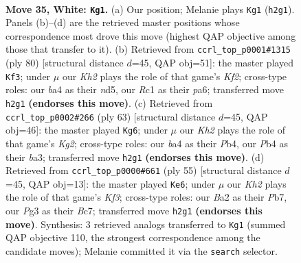 \documentclass[11pt]{article}
\begin{document}
\clearpage

\begin{figure}[p]\centering
\begin{subfigure}{0.46\textwidth}\centering
\resizebox{\linewidth}{!}{%
\newchessgame
\chessboard[
  setfen={r7/pp3p2/5k2/7p/bP2P3/P5Pp/B4r1K/R1R5 w - - 0 35},
  showmover=false,
  pgfstyle=straightmove, color=movearrow, markmove={h2-g1}
]}
\caption{}
\end{subfigure}\hfill
\begin{subfigure}{0.46\textwidth}\centering
\resizebox{\linewidth}{!}{%
\newchessgame
\chessboard[
  setfen={1r3k2/1p1R3R/p3p1p1/3n4/5P2/7P/PPr2KP1/8 w - - 17 41},
  showmover=false,
  pgfstyle=straightmove, color=movearrow, markmove={f2-f3}
]}
\caption{}
\end{subfigure}
\\[4pt]
\begin{subfigure}{0.46\textwidth}\centering
\resizebox{\linewidth}{!}{%
\newchessgame
\chessboard[
  setfen={r3r3/n2R2k1/5p2/p1P4p/1p6/BP2P1P1/1P5P/2R2K2 b - - 1 32},
  showmover=false,
  pgfstyle=straightmove, color=movearrow, markmove={g7-g6}
]}
\caption{}
\end{subfigure}\hfill
\begin{subfigure}{0.46\textwidth}\centering
\resizebox{\linewidth}{!}{%
\newchessgame
\chessboard[
  setfen={2r4r/1pbR3p/2p2k2/p4p2/5P2/2P5/P3P1BP/1R4K1 b - - 7 28},
  showmover=false,
  pgfstyle=straightmove, color=movearrow, markmove={f6-e6}
]}
\caption{}
\end{subfigure}
\caption{\textbf{Move 35, White: \texttt{Kg1}.} (a) Our position; Melanie plays \texttt{Kg1} (\texttt{h2g1}). Panels (b)--(d) are the retrieved master positions whose correspondence most drove this move (highest QAP objective among those that transfer to it). (b) Retrieved from \texttt{ccrl\_top\_p0001\#1315} (ply 80) [structural distance $d$=45, QAP obj=51]: the master played \texttt{Kf3}; under $\mu$ our \emph{Kh2} plays the role of that game's \emph{Kf2}; cross-type roles: our \emph{b}a4 as their \emph{n}d5, our \emph{R}c1 as their \emph{p}a6; transferred move \texttt{h2g1} \textbf{(endorses this move)}. (c) Retrieved from \texttt{ccrl\_top\_p0002\#266} (ply 63) [structural distance $d$=45, QAP obj=46]: the master played \texttt{Kg6}; under $\mu$ our \emph{Kh2} plays the role of that game's \emph{Kg2}; cross-type roles: our \emph{b}a4 as their \emph{P}b4, our \emph{P}b4 as their \emph{b}a3; transferred move \texttt{h2g1} \textbf{(endorses this move)}. (d) Retrieved from \texttt{ccrl\_top\_p0000\#661} (ply 55) [structural distance $d$=45, QAP obj=13]: the master played \texttt{Ke6}; under $\mu$ our \emph{Kh2} plays the role of that game's \emph{Kf3}; cross-type roles: our \emph{B}a2 as their \emph{P}b7, our \emph{P}g3 as their \emph{B}c7; transferred move \texttt{h2g1} \textbf{(endorses this move)}. Synthesis: 3 retrieved analogs transferred to \texttt{Kg1} (summed QAP objective 110, the strongest correspondence among the candidate moves); Melanie committed it via the \texttt{search} selector.}
\label{fig:thought-m68}
\end{figure}
\end{document}

